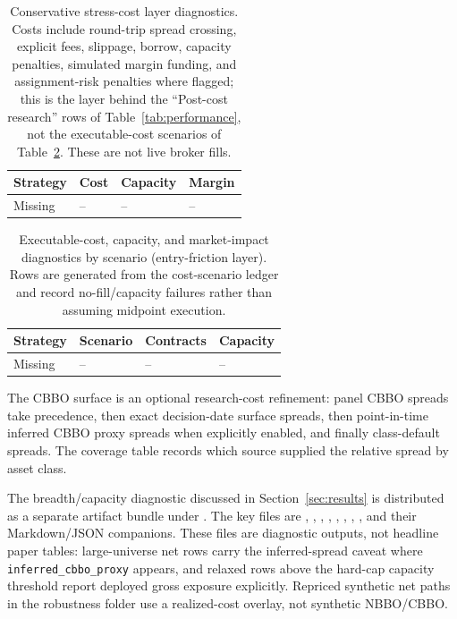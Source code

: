 \begin{table}[H]
\centering
\scriptsize
{}
  {\resizebox{\textwidth}{!}{}}
  {\begin{tabular}{llll}\toprule Strategy & Cost & Capacity & Margin \\\midrule Missing & -- & -- & -- \\\bottomrule\end{tabular}}
\caption{Conservative stress-cost layer diagnostics. Costs include round-trip spread
crossing, explicit fees, slippage, borrow, capacity penalties, simulated margin funding,
and assignment-risk penalties where flagged; this is the layer behind the ``Post-cost
research'' rows of Table~\ref{tab:performance}, not the executable-cost scenarios of
Table~\ref{tab:capacity_market_impact_app}. These are not live broker fills.}
\label{tab:costs_app}
\end{table}

\begin{table}[H]
\centering
\scriptsize
{}
  {\resizebox{\textwidth}{!}{}}
  {\begin{tabular}{llll}\toprule Strategy & Scenario & Contracts & Capacity \\\midrule Missing & -- & -- & -- \\\bottomrule\end{tabular}}
\caption{Executable-cost, capacity, and market-impact diagnostics by scenario
(entry-friction layer). Rows are generated from the cost-scenario ledger and record
no-fill/capacity failures rather than assuming midpoint execution.}
\label{tab:capacity_market_impact_app}
\end{table}

The CBBO surface is an optional research-cost refinement: panel CBBO spreads take
precedence, then exact decision-date surface spreads, then point-in-time inferred CBBO
proxy spreads when explicitly enabled, and finally class-default spreads. The coverage
table records which source supplied the relative spread by asset class.

The breadth/capacity diagnostic discussed in Section~\ref{sec:results} is distributed as
a separate artifact bundle under
. The key files are
, ,
, ,
, ,
, ,
and their Markdown/JSON
companions. These files are diagnostic outputs, not headline paper tables: large-universe
net rows carry the inferred-spread caveat where \texttt{inferred\_cbbo\_proxy} appears,
and relaxed rows above the hard-cap capacity threshold report deployed gross exposure
explicitly. Repriced synthetic net paths in the robustness folder use a realized-cost
overlay, not synthetic NBBO/CBBO.

